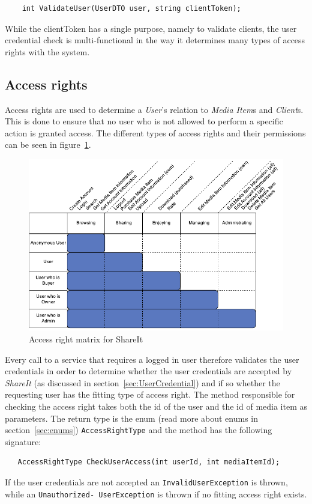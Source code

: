 \documentclass[../report.tex]{subfiles}
\begin{document}
\begin{center}
\begin{lstlisting}
	int ValidateUser(UserDTO user, string clientToken);
\end{lstlisting}
\end{center}


While the clientToken has a single purpose, namely to validate clients, the user credential check is multi-functional in the way it determines many types of access rights with the system.


\subsection{Access rights}


Access rights are used to determine a \textit{User}'s relation to \textit{Media Item}s and \textit{Client}s. This is done to ensure that no user who is not allowed to perform a specific action is granted access. The different types of access rights and their permissions can be seen in figure~\ref{fig:accessrightmatrix}. 

\begin{figure}[H]
\centering \includegraphics{AccessRightMatrix.pdf}
\caption{Access right matrix for ShareIt}
\label{fig:accessrightmatrix}
\end{figure}

Every call to a service that requires a logged in user therefore validates the user credentials in order to determine whether the user credentials are accepted by \textit{ShareIt} (as discussed in section~\ref{sec:UserCredential}) and if so whether the requesting user has the fitting type of access right. The method responsible for checking the access right takes both the id of the user and the id of media item as parameters. The return type is the enum (read more about enums in section~\ref{sec:enums}) \texttt{AccessRightType} and the method has the following signature:

\begin{lstlisting}
   AccessRightType CheckUserAccess(int userId, int mediaItemId);
\end{lstlisting}


If the user credentials are not accepted an \texttt{InvalidUserException} is thrown, while an \texttt{Unauthorized- UserException} is thrown if no fitting access right exists. 
\end{document}
